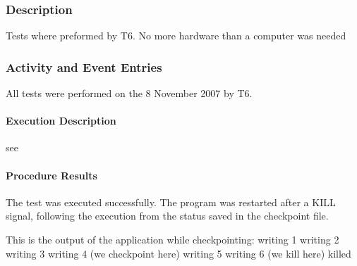 




\subsubsection{Description}
Tests where preformed by T6. No more hardware than a computer was needed

\subsubsection{Activity and Event Entries}
All tests were performed on the 8 November 2007 by T6.

\paragraph{Execution Description}
see 

\paragraph{Procedure Results}
The test was executed successfully. The program was re\-started after a KILL signal, following the execution from the status saved in 
the checkpoint file.

This is the output of the application while checkpointing:
writing 1
writing 2
writing 3
writing 4 (we checkpoint here)
writing 5
writing 6 (we kill here)
killed

